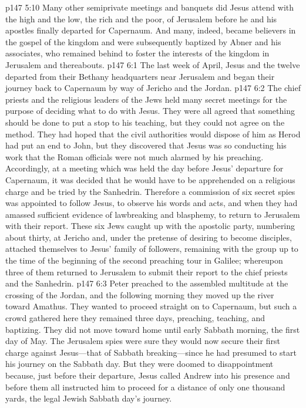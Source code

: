 \pc \vs p147 5:10 Many other semiprivate meetings and banquets did Jesus attend with the high and the low, the rich and the poor, of Jerusalem before he and his apostles finally departed for Capernaum. And many, indeed, became believers in the gospel of the kingdom and were subsequently baptized by Abner and his associates, who remained behind to foster the interests of the kingdom in Jerusalem and thereabouts.
\vs p147 6:1 The last week of April, Jesus and the twelve departed from their Bethany headquarters near Jerusalem and began their journey back to Capernaum by way of Jericho and the Jordan.
\vs p147 6:2 The chief priests and the religious leaders of the Jews held many secret meetings for the purpose of deciding what to do with Jesus. They were all agreed that something should be done to put a stop to his teaching, but they could not agree on the method. They had hoped that the civil authorities would dispose of him as Herod had put an end to John, but they discovered that Jesus was so conducting his work that the Roman officials were not much alarmed by his preaching. Accordingly, at a meeting which was held the day before Jesus’ departure for Capernaum, it was decided that he would have to be apprehended on a religious charge and be tried by the Sanhedrin. Therefore a commission of six secret spies was appointed to follow Jesus, to observe his words and acts, and when they had amassed sufficient evidence of lawbreaking and blasphemy, to return to Jerusalem with their report. These six Jews caught up with the apostolic party, numbering about thirty, at Jericho and, under the pretense of desiring to become disciples, attached themselves to Jesus’ family of followers, remaining with the group up to the time of the beginning of the second preaching tour in Galilee; whereupon three of them returned to Jerusalem to submit their report to the chief priests and the Sanhedrin.
\pc \vs p147 6:3 Peter preached to the assembled multitude at the crossing of the Jordan, and the following morning they moved up the river toward Amathus. They wanted to proceed straight on to Capernaum, but such a crowd gathered here they remained three days, preaching, teaching, and baptizing. They did not move toward home until early Sabbath morning, the first day of May. The Jerusalem spies were sure they would now secure their first charge against Jesus---that of Sabbath breaking---since he had presumed to start his journey on the Sabbath day. But they were doomed to disappointment because, just before their departure, Jesus called Andrew into his presence and before them all instructed him to proceed for a distance of only one thousand yards, the legal Jewish Sabbath day’s journey.
